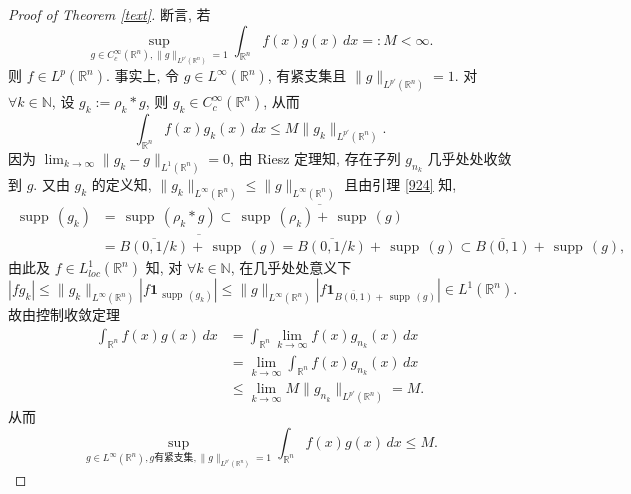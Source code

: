 \documentclass[a4paper,11pt]{article}
\theoremstyle{definition}
\def \supp {\mathop\mathrm{\,supp\,}}
\begin{document}
\begin{CJK*}{UTF8}{gbsn}
\begin{proof}[Proof of Theorem \ref{text}]
    断言, 若
    $$
        \sup_{g \in C_c^\infty(\mathbb{R}^n), \| g \|_{L^{p'}(\mathbb{R}^n)} = 1} 
            \int_{\mathbb{R}^n} f(x) g(x) \, dx =: M < \infty.
    $$
    则 $ f \in L^p(\mathbb{R}^n) $.
    事实上, 令 $ g \in L^\infty(\mathbb{R}^n) $, 有紧支集且 $ \| g \|_{L^{p'}(\mathbb{R}^n)} = 1 $.
    对 $ \forall k \in \mathbb{N} $, 设 $ g_k := \rho_k * g $, 则 $ g_k \in C_c^\infty(\mathbb{R}^n) $,
    从而
    $$
        \int_{\mathbb{R}^n} f(x) g_k(x) \, dx \leq M \| g_k \|_{L^{p'}(\mathbb{R}^n)}.
    $$
    因为 $ \lim_{k \to \infty} \| g_k - g \|_{L^1(\mathbb{R}^n)} = 0 $, 由 Riesz 定理知, 
    存在子列 $ g_{n_k} $ 几乎处处收敛到 $ g $. 又由 $ g_k $ 的定义知, 
    $ \|g_k\|_{L^\infty(\mathbb{R}^n)} \leq \|g\|_{L^\infty(\mathbb{R}^n)} $ 
    且由引理 \ref{924} 知,
    \begin{align*}
        \supp(g_k) &= \supp(\rho_k * g) 
                   \subset \overline{\supp(\rho_k) + \supp(g)} \\
                   &= \overline{\overline{B(0, 1/k)} + \supp(g)} 
                   = \overline{B(0, 1/k)} + \supp(g)
                   \subset \overline{B(0, 1)} + \supp(g), 
    \end{align*}
    由此及 $ f \in L^1_{loc}(\mathbb{R}^n) $ 知, 
    对 $ \forall k \in \mathbb{N} $, 在几乎处处意义下
    $$
        |f g_k| \leq \|g_k\|_{L^\infty(\mathbb{R}^n)} |f \mathbf{1}_{\supp(g_k)}|
                \leq \|g\|_{L^\infty(\mathbb{R}^n)} \left|f \mathbf{1}_{\overline{B(0, 1)} + \supp(g)}\right| 
                \in L^1(\mathbb{R}^n).
    $$
    故由控制收敛定理
    \begin{align*}
        \int_{\mathbb{R}^n} f(x) g(x) \, dx
            &= \int_{\mathbb{R}^n} \lim_{k \to \infty} f(x) g_{n_k}(x) \, dx \\
            &= \lim_{k \to \infty} \int_{\mathbb{R}^n} f(x) g_{n_k}(x) \, dx \\
            &\leq \lim_{k \to \infty} M \| g_{n_k} \|_{L^{p'}(\mathbb{R}^n)}
            = M.
    \end{align*}
    从而
    $$
        \sup_{g \in L^\infty(\mathbb{R}^n), g \text{有紧支集}, \| g \|_{L^{p'}(\mathbb{R}^n)} = 1} 
            \int_{\mathbb{R}^n} f(x) g(x) \, dx \leq M.
    $$
    

\end{proof}
\end{CJK*}
\end{document}
